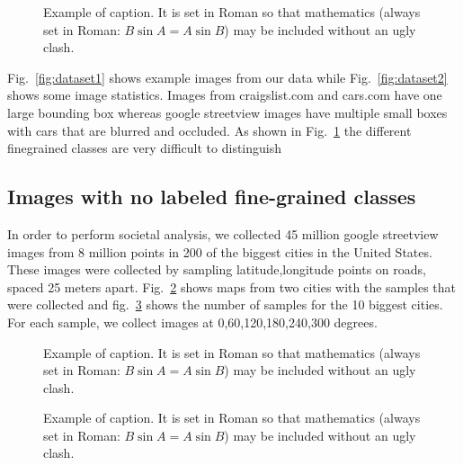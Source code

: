 \documentclass[10pt,twocolumn,letterpaper]{article}
\begin{document}
\begin{figure}[t]
\begin{center}
\fbox{\rule{0pt}{2in} \rule{0.9\linewidth}{0pt}}
\end{center}
   \caption{Example of caption.  It is set in Roman so that mathematics
   (always set in Roman: $B \sin A = A \sin B$) may be included without an
   ugly clash.}
\label{fig:dataset3}
\end{figure}

Fig.~\ref{fig:dataset1} shows example images from our data while Fig.~\ref{fig:dataset2} shows some image statistics. Images from craigslist.com and cars.com have one large bounding box whereas google streetview images have multiple small boxes with cars that are blurred and occluded. As shown in Fig.~\ref{fig:dataset3} the different finegrained classes are very difficult to distinguish

\subsection{Images with no labeled fine-grained classes}
In order to perform societal analysis, we collected 45 million google streetview images from 8 million points in 200 of the biggest cities in the United States. These images were collected by sampling latitude,longitude points on roads, spaced 25 meters apart. Fig.~\ref{fig:dataset4} shows maps from two cities with the samples that were collected and fig.~\ref{fig:dataset5} shows the number of samples for the 10 biggest cities. For each sample, we collect images at 0,60,120,180,240,300 degrees.

\begin{figure}[t]
\begin{center}
\fbox{\rule{0pt}{2in} \rule{0.9\linewidth}{0pt}}
\end{center}
   \caption{Example of caption.  It is set in Roman so that mathematics
   (always set in Roman: $B \sin A = A \sin B$) may be included without an
   ugly clash.}
\label{fig:dataset4}
\end{figure}

\begin{figure}[t]
\begin{center}
\fbox{\rule{0pt}{2in} \rule{0.9\linewidth}{0pt}}
\end{center}
   \caption{Example of caption.  It is set in Roman so that mathematics
   (always set in Roman: $B \sin A = A \sin B$) may be included without an
   ugly clash.}
\label{fig:dataset5}
\end{figure}
\end{document}
